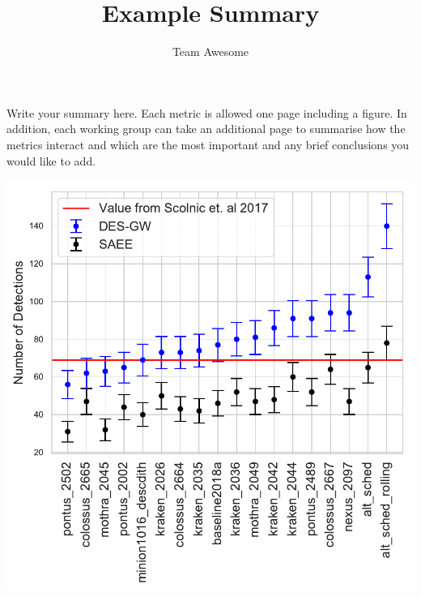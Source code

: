 \documentclass[a4paper,10pt]{article}
\title{Example Summary}
\author{Team Awesome}
\date{}
\begin{document}
\maketitle

Write your summary here. Each metric is allowed one page including a figure. In addition, each working group can take 
an additional page to summarise how the metrics interact and which are the most important and any brief conclusions you 
would like to add.\\


\begin{minipage}{\columnwidth}
\centering
 \includegraphics[width=0.5\columnwidth]{wfd_detection_counts_by_cadence}
\end{minipage}


%
%
\end{document}
